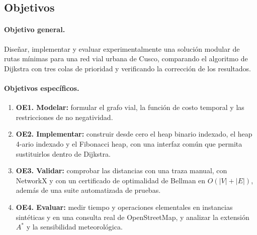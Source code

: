 \subsection{Objetivos}
\paragraph{Objetivo general.} Diseñar, implementar y evaluar experimentalmente una solución modular de rutas mínimas para una red vial urbana de Cusco, comparando el algoritmo de Dijkstra con tres colas de prioridad y verificando la corrección de los resultados.

\paragraph{Objetivos específicos.}
\begin{enumerate}
    \item \textbf{OE1. Modelar:} formular el grafo vial, la función de costo temporal y las restricciones de no negatividad.
    \item \textbf{OE2. Implementar:} construir desde cero el heap binario indexado, el heap 4-ario indexado y el Fibonacci heap, con una interfaz común que permita sustituirlos dentro de Dijkstra.
    \item \textbf{OE3. Validar:} comprobar las distancias con una traza manual, con NetworkX y con un certificado de optimalidad de Bellman en $O(|V|+|E|)$, además de una suite automatizada de pruebas.
    \item \textbf{OE4. Evaluar:} medir tiempo y operaciones elementales en instancias sintéticas y en una consulta real de OpenStreetMap, y analizar la extensión $A^*$ y la sensibilidad meteorológica.
\end{enumerate}

